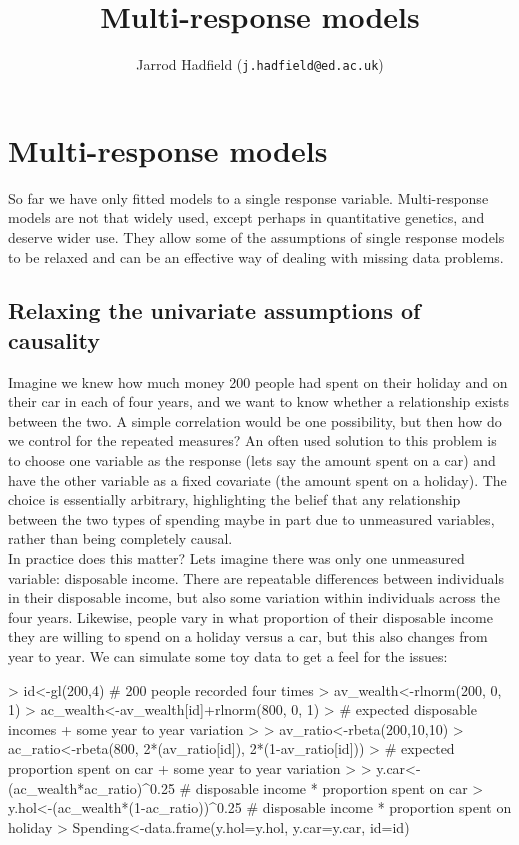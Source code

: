 \documentclass{article}
\title{Multi-response models}
\author{Jarrod Hadfield (\texttt{j.hadfield@ed.ac.uk})}
\begin{document}
\maketitle
\else
\chapter{Multi-response models}
\label{chap5}
\fi



So far we have only fitted models to a single response variable.  Multi-response models are not that widely used, except perhaps in quantitative genetics, and deserve wider use. They allow some of the assumptions of single response models to be relaxed and can be an effective way of dealing with missing data problems. 

\section{Relaxing the univariate assumptions of causality}

Imagine we knew how much money 200 people had spent on their holiday and on their car in each of four years, and we want to know whether a relationship exists between the two.  A simple correlation would be one possibility, but then how do we control for the repeated measures? An often used solution to this problem is to choose one variable as the response (lets say the amount spent on a car) and have the other variable as a fixed covariate (the amount spent on a holiday).  The choice is essentially arbitrary, highlighting the belief that any relationship between the two types of spending maybe in part due to unmeasured variables, rather than being completely causal.\\

In practice does this matter? Lets imagine there was only one unmeasured variable: disposable income. There are repeatable differences between individuals in their disposable income, but also some variation within individuals across the four years.  Likewise, people vary in what proportion of their disposable income they are willing to spend on a holiday versus a car, but this also changes from year to year.  We can simulate some toy data to get a feel for the issues: 

\begin{Schunk}
\begin{Sinput}
> id<-gl(200,4)                  # 200 people recorded four times                      
> av_wealth<-rlnorm(200, 0, 1)               
> ac_wealth<-av_wealth[id]+rlnorm(800, 0, 1) 
> # expected disposable incomes + some year to year variation
> 
> av_ratio<-rbeta(200,10,10)                 
> ac_ratio<-rbeta(800, 2*(av_ratio[id]), 2*(1-av_ratio[id])) 
> # expected proportion spent on car + some year to year variation
> 
> y.car<-(ac_wealth*ac_ratio)^0.25     # disposable income * proportion spent on car
> y.hol<-(ac_wealth*(1-ac_ratio))^0.25 # disposable income * proportion spent on holiday                              
> Spending<-data.frame(y.hol=y.hol, y.car=y.car, id=id)
\end{Sinput}
\end{Schunk}
\end{document}
